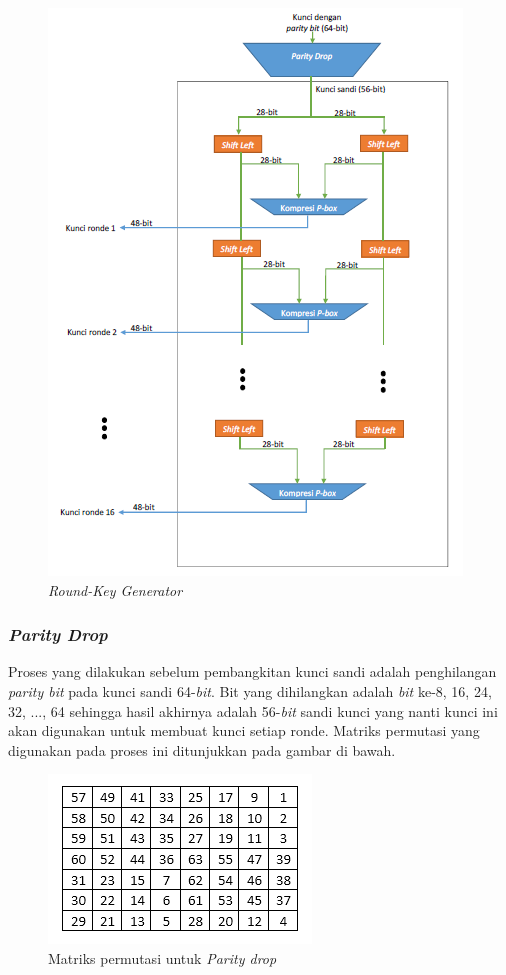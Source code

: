 \begin{figure}[ht]
	\includegraphics[scale=0.8]{Gambar/key_generation2}
	\centering
	\caption{\textit{Round-Key Generator}}
\end{figure}

\subsubsection{\textit{Parity Drop}}
Proses yang dilakukan sebelum pembangkitan kunci sandi adalah penghilangan \textit{parity bit} pada kunci sandi 64-\textit{bit}. Bit yang dihilangkan adalah \textit{bit} ke-8, 16, 24, 32, ..., 64 sehingga hasil akhirnya adalah 56-\textit{bit} sandi kunci yang nanti kunci ini akan digunakan untuk membuat kunci setiap ronde. Matriks permutasi yang digunakan pada proses ini ditunjukkan pada gambar di bawah.

\hfill \break
\hfill \break
\hfill \break
\begin{figure}[ht]
	\includegraphics[scale=0.8]{Gambar/parity_drop}
	\centering
	\caption{Matriks permutasi untuk \textit{Parity drop}}
\end{figure}

